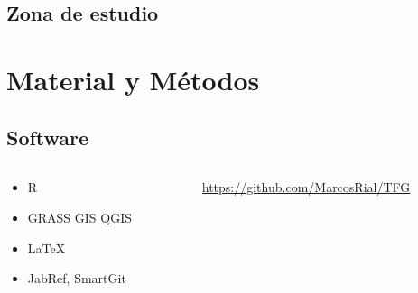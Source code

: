\documentclass[12pt]{beamer}
\begin{document}
\subsection{Zona de estudio}
\begin{frame}
\end{frame}

\section{Material y Métodos}
\subsection{Software}
\begin{frame}
	\begin{columns}
		\begin{column}{3.5cm} \vspace*{0.2cm}
			\begin{block}{}
				\begin{itemize}[<+->]
					\item R
					\item GRASS GIS QGIS
					\item \LaTeX
					\item JabRef, SmartGit
				\end{itemize}
			\end{block}
		\end{column}
		\begin{column}{7cm}
			\begin{block}{}
			\only<4> {\small	\url{https://github.com/MarcosRial/TFG}}
			\end{block}
		\end{column}
	\end{columns}
\end{frame}
\end{document}
